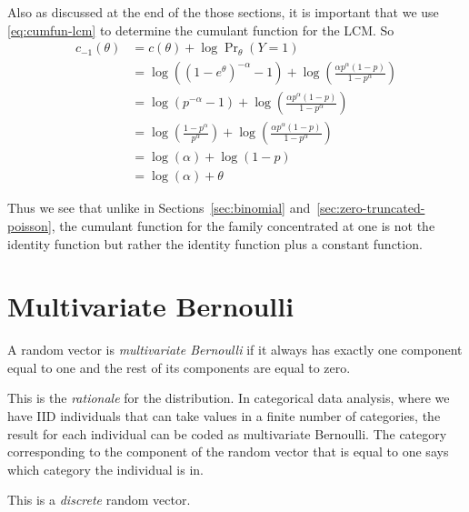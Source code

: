 Also as discussed at the end of the those sections,
it is important that we use \eqref{eq:cumfun-lcm} to determine the cumulant
function for the LCM.  So
\begin{align*}
   c_{- 1}(\theta)
   & =
   c(\theta) + \log \Pr\nolimits_\theta(Y = 1)
   \\
   & =
   \log\left((1 - e^\theta)^{- \alpha} - 1\right)
   +
   \log\left(\frac{\alpha p^\alpha (1 - p)}{1 - p^\alpha}\right)
   \\
   & =
   \log\left(p^{- \alpha} - 1\right)
   +
   \log\left(\frac{\alpha p^\alpha (1 - p)}{1 - p^\alpha}\right)
   \\
   & =
   \log\left(\frac{1 - p^\alpha}{p^\alpha}\right)
   +
   \log\left(\frac{\alpha p^\alpha (1 - p)}{1 - p^\alpha}\right)
   \\
   & =
   \log(\alpha) + \log(1 - p)
   \\
   & =
   \log(\alpha) + \theta
\end{align*}
%
%
%

Thus we see that unlike in Sections~\ref{sec:binomial}
and~\ref{sec:zero-truncated-poisson}, the cumulant function for
the family concentrated at one is not the identity function but
rather the identity function plus a constant function.

\section{Multivariate Bernoulli}
\label{sec:multivariate-bernoulli}

A random vector is \emph{multivariate Bernoulli} if it always has exactly
one component equal to one and the rest of its components are equal to zero.

This is the \emph{rationale} for the distribution.
In categorical data analysis, where we have IID individuals that can take
values in a finite number of categories, the result for each individual
can be coded as multivariate Bernoulli.  The category corresponding to the
component of the random vector that is equal to one says which category
the individual is in.

This is a \emph{discrete} random vector.

